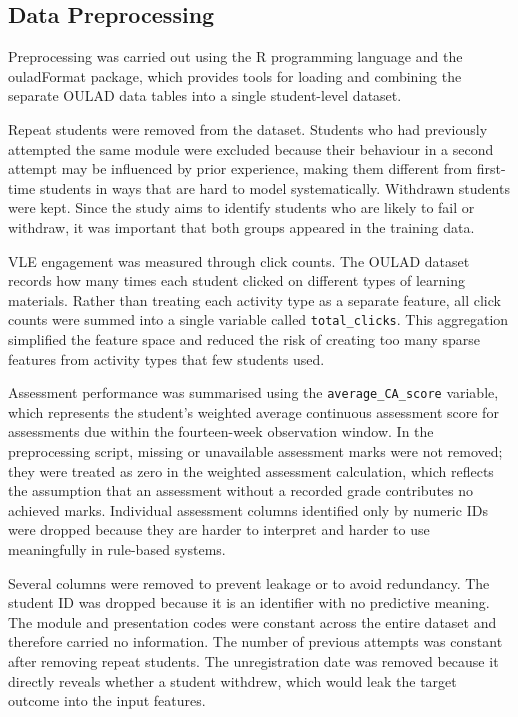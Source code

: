 \subsection{Data Preprocessing}

Preprocessing was carried out using the R programming language \parencite{rcore2024} and the ouladFormat package, which provides tools for loading and combining the separate OULAD data tables into a single student-level dataset.

Repeat students were removed from the dataset. Students who had previously attempted the same module were excluded because their behaviour in a second attempt may be influenced by prior experience, making them different from first-time students in ways that are hard to model systematically. Withdrawn students were kept. Since the study aims to identify students who are likely to fail or withdraw, it was important that both groups appeared in the training data.

VLE engagement was measured through click counts. The OULAD dataset records how many times each student clicked on different types of learning materials. Rather than treating each activity type as a separate feature, all click counts were summed into a single variable called \texttt{total\_clicks}. This aggregation simplified the feature space and reduced the risk of creating too many sparse features from activity types that few students used.

Assessment performance was summarised using the \texttt{average\_CA\_score} variable, which represents the student's weighted average continuous assessment score for assessments due within the fourteen-week observation window. In the preprocessing script, missing or unavailable assessment marks were not removed; they were treated as zero in the weighted assessment calculation, which reflects the assumption that an assessment without a recorded grade contributes no achieved marks. Individual assessment columns identified only by numeric IDs were dropped because they are harder to interpret and harder to use meaningfully in rule-based systems.

Several columns were removed to prevent leakage or to avoid redundancy. The student ID was dropped because it is an identifier with no predictive meaning. The module and presentation codes were constant across the entire dataset and therefore carried no information. The number of previous attempts was constant after removing repeat students. The unregistration date was removed because it directly reveals whether a student withdrew, which would leak the target outcome into the input features.

